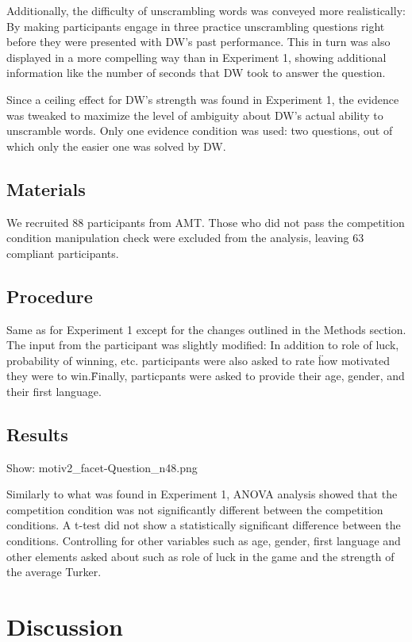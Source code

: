 \documentclass{article} \usepackage{apacite} \usepackage{graphicx} \usepackage{listings}
\begin{document}
Additionally, the difficulty of unscrambling words was conveyed more realistically: By making participants engage in three practice unscrambling questions right before they were presented with DW's past performance. This in turn was also displayed in a more compelling way than in Experiment 1, showing additional information like the number of seconds that DW took to answer the question.

Since a ceiling effect for DW's strength was found in Experiment 1, the evidence was tweaked to maximize the level of ambiguity about DW's actual ability to unscramble words. Only one evidence condition was used: two questions, out of which only the easier one was solved by DW.

\subsection{Materials}

We recruited 88 participants from AMT. Those who did not pass the competition condition manipulation check were excluded from the analysis, leaving 63 compliant participants.

\subsection{Procedure}

Same as for Experiment 1 except for the changes outlined in the Methods section. The input from the participant was slightly modified: In addition to role of luck, probability of winning, etc. participants were also asked to rate \"how motivated they were to win.\" Finally, particpants were asked to provide their age, gender, and their first language. 

\subsection{Results}

Show: motiv2_facet-Question_n48.png

Similarly to what was found in Experiment 1, ANOVA analysis showed that the competition condition was not significantly different between the competition conditions. A t-test did not show a statistically significant difference between the conditions. Controlling for other variables such as age, gender, first language and other elements asked about such as role of luck in the game and the strength of the average Turker.


\section{Discussion}
\end{document}
